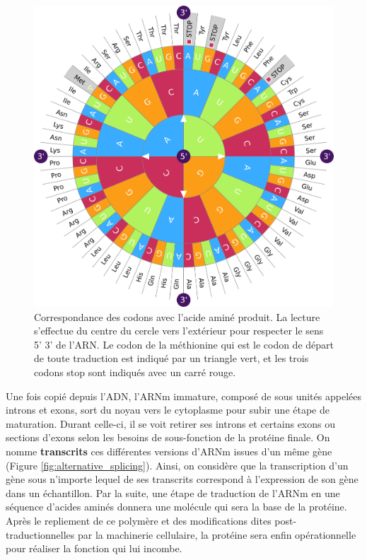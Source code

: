 \begin{figure}[!ht]
    \centering
    \includegraphics[width=\textwidth]{img/intro/1_context/intro_1_code_genetique.pdf}
    \caption[Correspondance des codons avec l'acide aminé produit.]{Correspondance des codons avec l'acide aminé produit. La lecture s'effectue du centre du cercle vers l'extérieur pour respecter le sens 5' \textrightarrow{} 3' de l'ARN. Le codon de la méthionine qui est le codon de départ de toute traduction est indiqué par un triangle vert, et les trois codons stop sont indiqués avec un carré rouge.}
    \label{fig:intro_code_genetique}
\end{figure}


Une fois copié depuis l'ADN, l'ARNm immature, composé de sous unités appelées introns et exons, sort du noyau vers le cytoplasme pour subir une étape de maturation. Durant celle-ci, il se voit retirer ses introns et certains exons ou sections d'exons selon les besoins de sous-fonction de la protéine finale. On nomme \textbf{transcrits} ces différentes versions d'ARNm issues d'un même gène (Figure \ref{fig:alternative_splicing}). Ainsi, on considère que la transcription d'un gène sous n'importe lequel de ses transcrits correspond à l'expression de son gène dans un échantillon. Par la suite, une étape de traduction de l'ARNm en une séquence d'acides aminés donnera une molécule qui sera la base de la protéine. Après le repliement de ce polymère et des modifications dites post-traductionnelles par la machinerie cellulaire, la protéine sera enfin opérationnelle pour réaliser la fonction qui lui incombe. 

